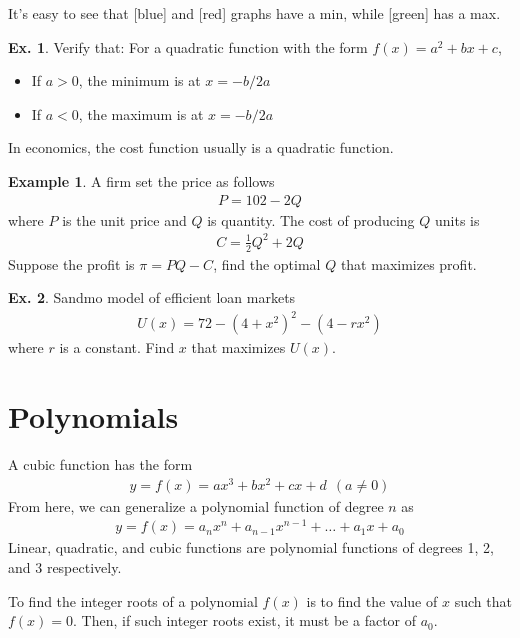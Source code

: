 \documentclass[10pt,a4paper]{book}
\theoremstyle{definition}\newtheorem{definition}{Definition}
\theoremstyle{definition}\newtheorem{fact}{Fact}
\theoremstyle{definition}\newtheorem{ex}{Ex.}
\theoremstyle{definition}\newtheorem{project}{Project}
\theoremstyle{definition}\newtheorem{problem}{Problem}
\theoremstyle{definition}\newtheorem{example}{Example}
\numberwithin{theorem}{chapter}
\numberwithin{corollary}{chapter}
\numberwithin{assumption}{chapter}
\numberwithin{definition}{chapter}
\numberwithin{prop}{chapter}
\numberwithin{notation}{chapter}
\numberwithin{problem}{chapter}
\numberwithin{example}{chapter}
\numberwithin{fact}{chapter}
\numberwithin{ex}{chapter}
\begin{document}
	It's easy to see that [blue] and [red] graphs have a min, while [green] has a max.
	
	\begin{ex}
		Verify that: For a quadratic function with the form $f(x) = a^2 + bx + c$,
		\begin{itemize}
			\item If $a>0$, the minimum is at $x=-b/2a$
			\item If $a<0$, the maximum is at $x=-b/2a$
		\end{itemize}
	\end{ex}
	
	In economics, the cost function usually is a quadratic function.
	\begin{example}
		A firm set the price as follows
		\begin{align*}
			P = 102 - 2Q 
		\end{align*}
		where $P$ is the unit price and $Q$ is quantity. The cost of producing $Q$ units is
		\begin{align*}
			C = \frac{1}{2} Q^2 + 2Q 
		\end{align*}
		Suppose the profit is $\pi = PQ-C$, find the optimal $Q$ that maximizes profit.
	\end{example}
	
	\begin{ex}
		Sandmo model of efficient loan markets
		\begin{align*}
			U(x) = 72 - (4+x^2)^2 - (4-rx^2) 
		\end{align*}
		where $r$ is a constant. Find $x$ that maximizes $U(x)$.
	\end{ex}
	
	\section{Polynomials}
	A cubic function has the form
	\begin{align*}
		y = f(x) = ax^3 + bx^2 + cx + d \ \ (a\neq 0) 
	\end{align*}
	From here, we can generalize a polynomial function of degree $n$ as
	\begin{align*}
		y = f(x) = a_n x^n + a_{n-1} x^{n-1} + \dots + a_1 x + a_0 
	\end{align*}
	Linear, quadratic, and cubic functions are polynomial functions of degrees 1, 2, and 3 respectively.
	
	To find the integer roots of a polynomial  $f(x)$ is to find the value of $x$ such that $f(x)=0$. Then, if such integer roots exist, it must be a factor of $a_0$.
	
\end{document}
